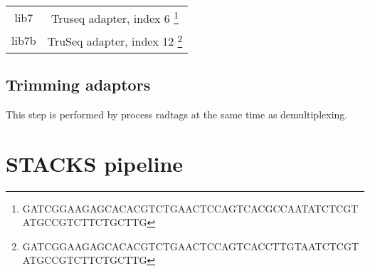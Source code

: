\documentclass[10pt,a4paper]{report}
\begin{document}
\begin{center}
\begin{tabular}{c c}
lib7 & Truseq adapter, index 6 \footnote{GATCGGAAGAGCACACGTCTGAACTCCAGTCACGCCAATATCTCGTATGCCGTCTTCTGCTTG}\\ 
lib7b & TruSeq adapter, index 12 \footnote{GATCGGAAGAGCACACGTCTGAACTCCAGTCACCTTGTAATCTCGTATGCCGTCTTCTGCTTG}\\
\end{tabular}
\end{center}
\section{Trimming adaptors}
This step is performed by process radtags at the same time as demultiplexing.
\chapter{STACKS pipeline}
\end{document}
